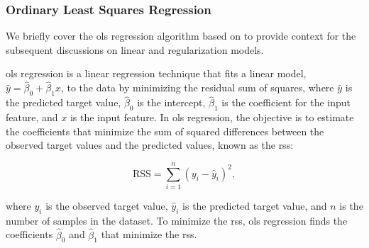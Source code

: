 \subsubsection{Ordinary Least Squares Regression}\label{sec:ols}
We briefly cover the \gls{ols} regression algorithm based on \citet{James2023AnIS} to provide context for the subsequent discussions on linear and regularization models.

\gls{ols} regression is a linear regression technique that fits a linear model, $\hat{y} = \hat{\beta}_0 + \hat{\beta}_1 x$, to the data by minimizing the residual sum of squares, where $\hat{y}$ is the predicted target value, $\hat{\beta}_0$ is the intercept, $\hat{\beta}_1$ is the coefficient for the input feature, and $x$ is the input feature.
In \gls{ols} regression, the objective is to estimate the coefficients that minimize the sum of squared differences between the observed target values and the predicted values, known as the \gls{rss}:

$$
\text{RSS} = \sum_{i=1}^{n} (y_i - \hat{y}_i)^2,
$$

where $y_i$ is the observed target value, $\hat{y}_i$ is the predicted target value, and $n$ is the number of samples in the dataset.
To minimize the \gls{rss}, \gls{ols} regression finds the coefficients $\hat{\beta}_0$ and $\hat{\beta}_1$ that minimize the \gls{rss}.